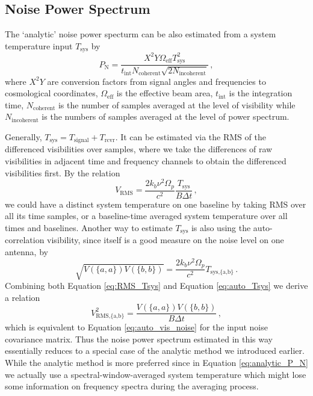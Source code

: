 \documentclass[12pt,a4paper]{article}
\begin{document}
\subsection{Noise Power Spectrum}
The `analytic' noise power specturm can be also estimated from a system temperature input $T_\text{sys}$ by  \citep{cheng2018characterizing,kern2020mitigating}
\begin{equation}
\label{eq:analytic_P_N}
    P_\text{N} = \frac{X^2 Y \Omega_\text{eff} T_\text{sys}^2}{t_\text{int} N_\text{coherent}\sqrt{2N_\text{incoherent}}}\,,
\end{equation}
where $X^2Y$ are conversion factors from signal angles and frequencies to cosmological coordinates, $\Omega_\text{eff}$ is the effective beam area, $t_\text{int}$ is the integration time, $N_\text{coherent}$ is the number of samples averaged at the level of visibility while $N_\text{incoherent}$ is the numbers of samples averaged at the level of power spectrum.

Generally, $T_\text{sys} = T_\text{signal} + T_\text{rcvr}$. It can be estimated via the RMS of the differenced visibilities over samples, where we take the differences of raw visibilities in adjacent time and frequency channels to obtain the differenced visibilities first. By the relation
\begin{equation}
\label{eq:RMS_Tsys}
V_\text{RMS} = \frac{2k_b \nu^2 \Omega_p}{c^2}\frac{T_\text{sys}}{B \Delta t} \,,
\end{equation}
we could have a distinct system temperature on one baseline by taking RMS over all its time samples, or a baseline-time averaged system temperature over all times and baselines. Another way to estimate $T_\text{sys}$ is also using the auto-correlation visibility, since itself is a good measure on the noise level on one antenna, by
\begin{equation}
\label{eq:auto_Tsys}
\sqrt{V(\{a,a\}) V(\{b,b\})} = \frac{2k_b \nu^2 \Omega_p}{c^2} T_\text{sys,\{a,b\}}\,.
\end{equation}
Combining both Equation \ref{eq:RMS_Tsys} and Equation \ref{eq:auto_Tsys} we derive a relation
\begin{equation}
\label{eq:auto2RMS}
V^2_\text{RMS,\{a,b\}} = \frac{V(\{a,a\}) V(\{b,b\})}{B \Delta t}\,,
\end{equation}
which is equivalent to Equation \ref{eq:auto_vis_noise} for the input noise covariance matrix. Thus the noise power spectrum estimated in this way essentially reduces to a special case of the analytic method we introduced earlier. While the analytic method is more preferred since in Equation \ref{eq:analytic_P_N} we actually use a spectral-window-averaged system temperature which might lose some information on frequency spectra during the averaging process.


\end{document}
